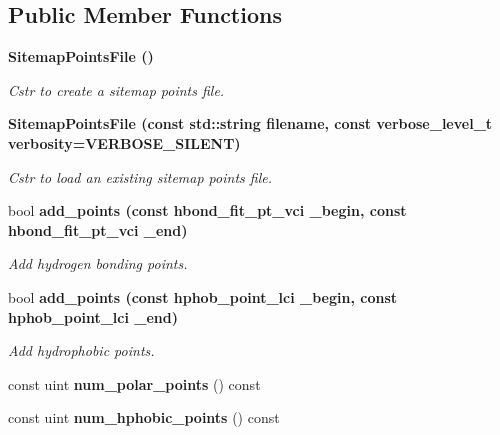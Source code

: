 \subsection*{Public Member Functions}
\begin{CompactItemize}
\item 
\bf{Sitemap\-Points\-File} ()\label{classASCbase_1_1SitemapPointsFile_db5b966cb4e3f26a969479259b7a63b5}

\begin{CompactList}\small\item\em Cstr to create a sitemap points file. \item\end{CompactList}\item 
\bf{Sitemap\-Points\-File} (const std::string filename, const verbose\_\-level\_\-t verbosity=VERBOSE\_\-SILENT)\label{classASCbase_1_1SitemapPointsFile_5f355b3286eaea41596b433e8d5cd476}

\begin{CompactList}\small\item\em Cstr to load an existing sitemap points file. \item\end{CompactList}\item 
bool \bf{add\_\-points} (const hbond\_\-fit\_\-pt\_\-vci \_\-begin, const hbond\_\-fit\_\-pt\_\-vci \_\-end)\label{classASCbase_1_1SitemapPointsFile_0f7b8e2ccb3f1dc27fcc4720b0ae14c5}

\begin{CompactList}\small\item\em Add hydrogen bonding points. \item\end{CompactList}\item 
bool \bf{add\_\-points} (const hphob\_\-point\_\-lci \_\-begin, const hphob\_\-point\_\-lci \_\-end)\label{classASCbase_1_1SitemapPointsFile_5dd5cd935f9623f2e8e3ce4051c156ba}

\begin{CompactList}\small\item\em Add hydrophobic points. \item\end{CompactList}\item 
const uint \textbf{num\_\-polar\_\-points} () const \label{classASCbase_1_1SitemapPointsFile_4a9728a68610afe41d65332ff73bcbf2}

\item 
const uint \textbf{num\_\-hphobic\_\-points} () const \label{classASCbase_1_1SitemapPointsFile_5d261bb85ca34bf9797ab126d8c46960}

\end{CompactItemize}

